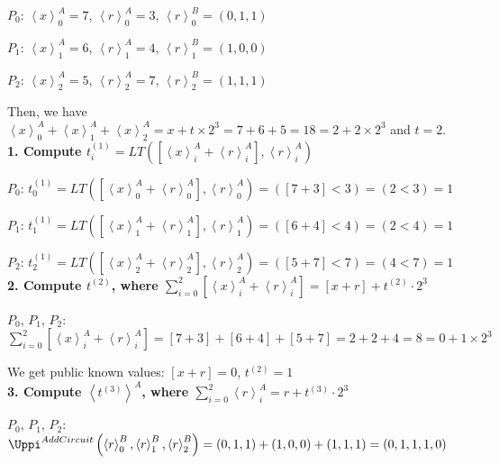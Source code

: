 $P_0$: $\left\langle x\right\rangle^A_0=7 $, $\left\langle r\right\rangle^A_0=3 $, $\left\langle r\right\rangle ^B_0=\left(0,1,1\right) $

$P_1$: $\left\langle x\right\rangle^A_1=6 $, $\left\langle r\right\rangle^A_1=4 $, $\left\langle r\right\rangle ^B_1=\left(1,0,0\right) $

$P_2$: $\left\langle x\right\rangle^A_2=5 $, $\left\langle r\right\rangle^A_2=7 $, $\left\langle r\right\rangle ^B_2=\left(1,1,1\right) $

Then, we have $\left\langle x\right\rangle^A_0+\left\langle x\right\rangle^A_1+\left\langle x\right\rangle^A_2=x+t\times 2^{3}=7+6+5=18=2+2\times 2^{3}$ and $t=2$.
\\

\textbf{1. Compute $t^{(1)}_i=LT\left(\left[\left\langle x\right\rangle_i^A + \left\langle r\right\rangle^A_i\right] ,\left\langle r\right\rangle^A_i \right)$}

$P_0$: $t^{(1)}_0=LT\left(\left[\left\langle x\right\rangle_0^A + \left\langle r\right\rangle^A_0\right] ,\left\langle r\right\rangle^A_0 \right)=\left(\left[7+3\right] <3\right)=\left(2 <3\right) =1$

$P_1$: $t^{(1)}_1=LT\left(\left[\left\langle x\right\rangle_1^A + \left\langle r\right\rangle^A_1\right] ,\left\langle r\right\rangle^A_1 \right)=\left(\left[6+4\right] <4\right)=\left(2 <4\right) =1$

$P_2$: $t^{(1)}_2=LT\left(\left[\left\langle x\right\rangle_2^A + \left\langle r\right\rangle^A_2\right] ,\left\langle r\right\rangle^A_2 \right)=\left(\left[5+7\right] <7\right)=\left(4 <7\right) =1$\\

\textbf{2. Compute $t^{(2)}$, where $ \sum_{i = 0}^{2}  \left[ \left\langle x\right\rangle_i^A+ \left\langle r\right\rangle^A_i \right]  =\left[x+r  \right]   + t^{(2)}\cdot 2^{3}$}

$P_0$, $P_1$, $P_2$: $\sum_{i = 0}^{2}  \left[ \left\langle x\right\rangle_i^A+ \left\langle r\right\rangle^A_i \right]=\left[7+3\right] +\left[6+4\right]+\left[5+7\right] =2+2+4=8=0+1\times 2^{3}$

We get public known values: $\left[x+r  \right]=0$, $t^{(2)}=1$\\

\textbf{3. Compute $\left\langle t^{\left(3\right) }\right\rangle^A$, where $\sum_{i = 0}^{2}\left\langle r\right\rangle^A_i=r+  t^{\left(3\right) } \cdot 2^{3}$}

$P_0$, $P_1$, $P_2$: $\Uppi^{AddCircuit}\left(\left\langle r\right\rangle ^B_0, \left\langle r\right\rangle ^B_1,\left\langle r\right\rangle ^B_2\right) =\left(0,1,1\right)+\left(1,0,0\right)+\left(1,1,1\right) =\left(0,1,1,1,0\right) $

